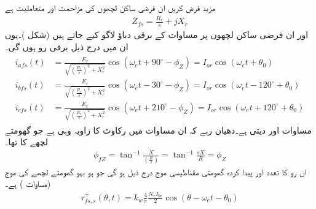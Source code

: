 مزید فرض کریں ان فرضی ساکن لچھوں کی مزاحمت   اور متعاملیت   ہے
\begin{align}
Z_{fs}=\frac{R_r}{s}+j X_r
\end{align}
اور ان فرضی ساکن لچھوں پر مساوات   کے برقی دباؤ لاگو کیے جاتے ہیں (شکل )۔یوں  ان میں درج ذیل برقی رو ہوں گی۔
\begin{gather}
\begin{aligned}
i_{afs}(t)&=\frac{E_r}{\sqrt{\left(\frac{R_r}{s} \right)^2+X_r^2}} \cos \left(\omega_e t+90^{\circ} -\phi_Z  \right)=I_{or} \cos \left(\omega_e t+\theta_0 \right)\\
i_{bfs}(t)&=\frac{E_r}{\sqrt{\left(\frac{R_r}{s} \right)^2+X_r^2}} \cos \left(\omega_e t-30^{\circ} -\phi_Z  \right)=I_{or}\cos \left(\omega_e t-120^{\circ} +\theta_0 \right)\\
i_{cfs}(t)&=\frac{E_r}{\sqrt{\left(\frac{R_r}{s} \right)^2+X_r^2}} \cos \left(\omega_e t+210^{\circ} -\phi_Z  \right)=I_{or} \cos \left(\omega_e t+120^{\circ}+\theta_0 \right)
\end{aligned}
\end{gather}
مساوات    اور  دیتی ہے۔دھیان رہے کہ ان مساوات میں  رکاوٹ کا زاویہ   وہی ہے جو گھومتے لچھے کا تھا۔
\begin{align}
\phi_{fZ}=\tan^{-1} \frac{X}{\left(\frac{R}{s} \right)}=\tan^{-1} \frac{s X}{R}=\phi_Z
\end{align}
ان  رو کا تعدد  اور پیدا کردہ گھومتی مقناطیسی موج درج ذیل ہو گی جو ہو بہو گھومتے لچھے کی موج  (مساوات ) ہے۔
\begin{align}
\tau_{fs,s}^+(\theta,t)=k_w \frac{4}{\pi}\frac{N_r I_{0r}}{2} \cos (\theta-\omega_e t-\theta_0)
\end{align}

